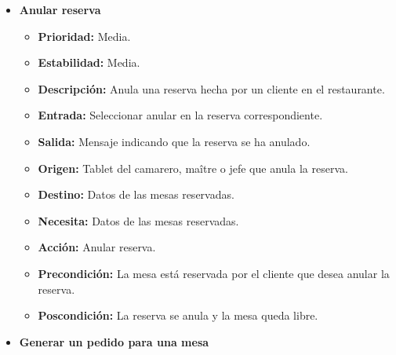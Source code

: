 \documentclass[spanish,a4paper,11pt, twoside]{report}	%
\begin{document}
\begin{itemize}
\begin{itemize}
		\end{itemize}%

\item \textbf{Anular reserva} %

		\begin{itemize}
			\item \textbf{Prioridad: } Media.
			\item \textbf{Estabilidad: } Media.
			\item \textbf{Descripción: } Anula una reserva hecha por un cliente en el restaurante.
			\item \textbf{Entrada: } Seleccionar anular en la reserva correspondiente.
			\item \textbf{Salida: } Mensaje indicando que la reserva se ha anulado.
			\item \textbf{Origen: } Tablet del camarero, maître o jefe que anula la reserva.
			\item \textbf{Destino: } Datos de las mesas reservadas.
			\item \textbf{Necesita: } Datos de las mesas reservadas.
			\item \textbf{Acción: } Anular reserva.
			\item \textbf{Precondición: } La mesa está reservada por el cliente que desea anular la reserva.
			\item \textbf{Poscondición: } La reserva se anula y la mesa queda libre.

		\end{itemize}%

	\item \textbf{Generar un pedido para una mesa} %


\end{itemize}
\end{document}

